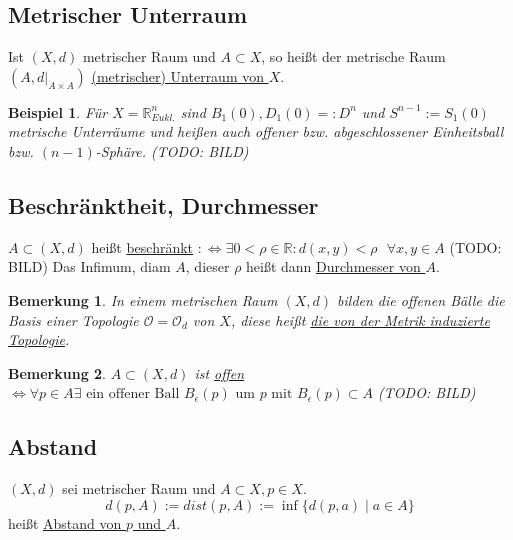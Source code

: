 \documentclass[a4paper,11pt,notitlepage]{report}
\newtheorem{definition}{Definition}[chapter]
\newtheorem{remark}{Bemerkung}[chapter]
\newtheorem{example}{Beispiel}[chapter]
\newcommand{\R}{{\ensuremath{\mathbb{R}}}}
\newcommand{\OO}{{\ensuremath{\mathcal{O}}}}
\newenvironment{Kasten}[1]
{
\hspace{0.05\linewidth}
\begin{center}
\begin{minipage}{0.9\linewidth}
\setlength{\fboxsep}{18pt}
\definecolor{shadecolor}{gray}{0.9}
\definecolor{framecolor}{gray}{0}
\def\FrameCommand{\fcolorbox{framecolor}{shadecolor}}
\MakeFramed {\FrameRestore}
\subsection{#1}
\begin{itshape}
}
{
\end{itshape}
\endMakeFramed
\end{minipage}
\end{center}
\vspace{1em}
}
\begin{document}
\begin{Kasten}{Metrischer Unterraum}
	Ist $(X,d)$ metrischer Raum und $A \subset X$, so heißt der metrische Raum $(A, d \big |_{A \times A})$ \underline{(metrischer) Unterraum von $X$}.
\end{Kasten}

\begin{example}
	Für $X=\R_{Eukl.}^{n}$ sind $B_1(0), D_1(0) =: D^n$ und $S^{n-1}:=S_1(0)$ metrische Unterräume und heißen auch offener bzw. abgeschlossener Einheitsball bzw. $(n-1)$-Sphäre.
	\newline
	(TODO: BILD)
\end{example}

\begin{Kasten}{Beschränktheit, Durchmesser}
	$A \subset (X,d)$ heißt \underline{beschränkt} \newline $:\Leftrightarrow \exists 0 < \rho \in \R \colon d(x,y) < \rho  \text{   } \forall x,y \in A$
	\newline
	(TODO: BILD)
	\newline
	Das Infimum, diam $A$, dieser $\rho$ heißt dann \underline{Durchmesser von $A$}.
\end{Kasten}

\begin{remark}
	In einem metrischen Raum $(X,d)$ bilden die offenen Bälle die Basis einer Topologie $\OO=\OO_d$ von $X$, diese heißt \underline{die von der Metrik induzierte Topologie}.
\end{remark}

\begin{remark}
	$A \subset (X,d)$ ist \underline{offen}
	\newline
	$\Leftrightarrow \forall p \in A \exists \text{ ein offener Ball } B_\epsilon(p) \text{ um } p \text{ mit } B_\epsilon(p) \subset A$
	\newline
	(TODO: BILD)
\end{remark}

\begin{Kasten}{Abstand}
	$(X,d)$ sei metrischer Raum und $A \subset X, p \in X$.
	$$d(p,A) := dist(p,A):= \inf \{d(p,a) \mid a\in A \}$$
	heißt \underline{Abstand von $p$ und $A$}.
\end{Kasten}
\end{document}
